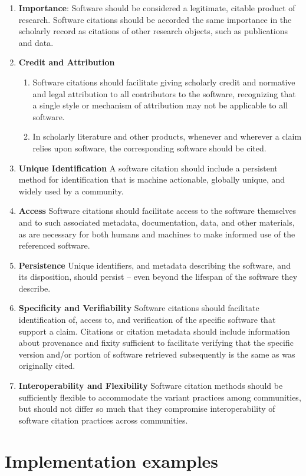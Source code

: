 \documentclass[11pt, oneside]{amsart}
\begin{document}
\begin{enumerate}
\item \textbf{Importance}:
Software should be considered a legitimate, citable product of research. Software citations should be accorded the same importance in the scholarly record as citations of other research objects, such as publications and data.
\item \textbf{Credit and Attribution}
\begin{enumerate}
\item Software citations should facilitate giving scholarly credit and normative and legal attribution to all contributors to the software, recognizing that a single style or mechanism of attribution may not be applicable to all software.
\item In scholarly literature and other products, whenever and wherever a claim relies upon software, the corresponding software should be cited.
\end{enumerate}
\item \textbf{Unique Identification}
A software citation should include a persistent method for identification that is machine actionable, globally unique, and widely used by a community.
\item \textbf{Access}
Software citations should facilitate access to the software themselves and to such associated metadata, documentation, data, and other materials, as are necessary for both humans and machines to make informed use of the referenced software.
\item \textbf{Persistence}
Unique identifiers, and metadata describing the software, and its disposition, should persist -- even beyond the lifespan of the software they describe.
\item \textbf{Specificity and Verifiability}
Software citations should facilitate identification of, access to, and verification of the specific software that support a claim. Citations or citation metadata should include information about provenance and fixity sufficient to facilitate verifying that the specific version and/or portion of software retrieved subsequently is the same as was originally cited.
\item \textbf{Interoperability and Flexibility}
Software citation methods should be sufficiently flexible to accommodate the variant practices among communities, but should not differ so much that they compromise interoperability of software citation practices across communities.
\end{enumerate}


\section{Implementation examples}
\label{sec:examples}



\end{document}
